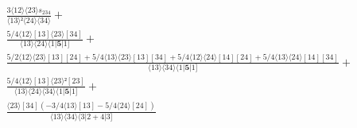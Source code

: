 \documentclass[varwidth, border=5pt]{standalone}
\begin{document}
\begin{my}
$\begin{gathered}
\scriptscriptstyle\frac{3⟨12⟩⟨23⟩s_{234}}{⟨13⟩²⟨24⟩⟨34⟩} +\\
\scriptscriptstyle\frac{5/4⟨12⟩[13]⟨23⟩[34]}{⟨13⟩⟨24⟩⟨1|𝟓|1]} +\\
\scriptscriptstyle\frac{5/2⟨12⟩⟨23⟩[13][24]+5/4⟨13⟩⟨23⟩[13][34]+5/4⟨12⟩⟨24⟩[14][24]+5/4⟨13⟩⟨24⟩[14][34]}{⟨13⟩⟨34⟩⟨1|𝟓|1]} +\\
\scriptscriptstyle\frac{5/4⟨12⟩[13]⟨23⟩²[23]}{⟨13⟩⟨24⟩⟨34⟩⟨1|𝟓|1]} +\\
\scriptscriptstyle\frac{⟨23⟩[34](-3/4⟨13⟩[13]-5/4⟨24⟩[24])}{⟨13⟩⟨34⟩⟨3|2+4|3]} \phantom{+}
\end{gathered}$
\end{my}
\end{document}
